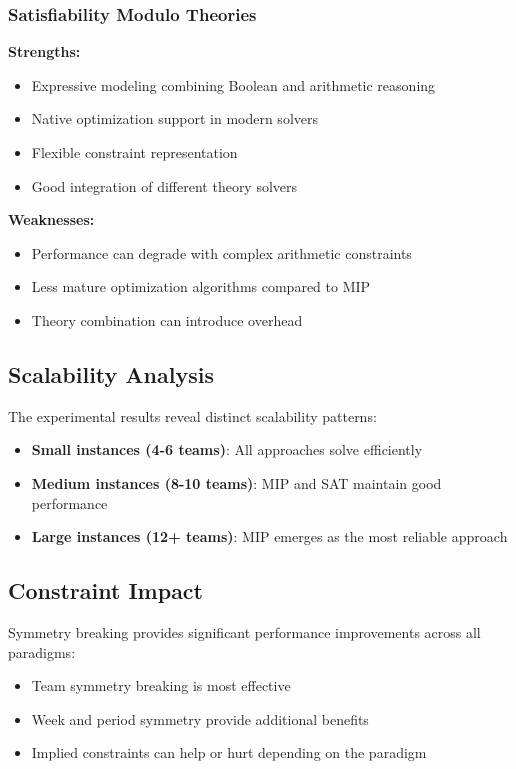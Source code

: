 \documentclass[11pt]{article}
\begin{document}
\subsubsection{Satisfiability Modulo Theories}
\textbf{Strengths:}
\begin{itemize}
    \item Expressive modeling combining Boolean and arithmetic reasoning
    \item Native optimization support in modern solvers
    \item Flexible constraint representation
    \item Good integration of different theory solvers
\end{itemize}

\textbf{Weaknesses:}
\begin{itemize}
    \item Performance can degrade with complex arithmetic constraints
    \item Less mature optimization algorithms compared to MIP
    \item Theory combination can introduce overhead
\end{itemize}

\subsection{Scalability Analysis}

The experimental results reveal distinct scalability patterns:

\begin{itemize}
    \item \textbf{Small instances (4-6 teams)}: All approaches solve efficiently
    \item \textbf{Medium instances (8-10 teams)}: MIP and SAT maintain good performance
    \item \textbf{Large instances (12+ teams)}: MIP emerges as the most reliable approach
\end{itemize}

\subsection{Constraint Impact}

Symmetry breaking provides significant performance improvements across all paradigms:
\begin{itemize}
    \item Team symmetry breaking is most effective
    \item Week and period symmetry provide additional benefits
    \item Implied constraints can help or hurt depending on the paradigm
\end{itemize}
\end{document}
